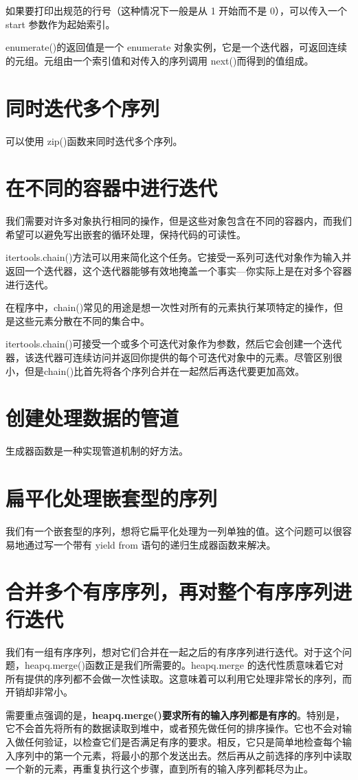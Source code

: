 如果要打印出规范的行号（这种情况下一般是从 1 开始而不是 0），可以传入一个 start 参数作为起始索引。

enumerate()的返回值是一个 enumerate 对象实例，它是一个迭代器，可返回连续的元组。元组由一个索引值和对传入的序列调用 next()而得到的值组成。
\section{同时迭代多个序列}
可以使用 zip()函数来同时迭代多个序列。
\section{在不同的容器中进行迭代}
我们需要对许多对象执行相同的操作，但是这些对象包含在不同的容器内，而我们希望可以避免写出嵌套的循环处理，保持代码的可读性。

itertools.chain()方法可以用来简化这个任务。它接受一系列可迭代对象作为输入并返回一个迭代器，这个迭代器能够有效地掩盖一个事实—你实际上是在对多个容器进行迭代。

在程序中，chain()常见的用途是想一次性对所有的元素执行某项特定的操作，但是这些元素分散在不同的集合中。

itertools.chain()可接受一个或多个可迭代对象作为参数，然后它会创建一个迭代器，该迭代器可连续访问并返回你提供的每个可迭代对象中的元素。尽管区别很小，但是chain()比首先将各个序列合并在一起然后再迭代要更加高效。
\section{创建处理数据的管道}
生成器函数是一种实现管道机制的好方法。
\section{扁平化处理嵌套型的序列}
我们有一个嵌套型的序列，想将它扁平化处理为一列单独的值。这个问题可以很容易地通过写一个带有 yield from 语句的递归生成器函数来解决。
\section{合并多个有序序列，再对整个有序序列进行迭代}
我们有一组有序序列，想对它们合并在一起之后的有序序列进行迭代。对于这个问题，heapq.merge()函数正是我们所需要的。heapq.merge 的迭代性质意味着它对所有提供的序列都不会做一次性读取。这意味着可以利用它处理非常长的序列，而开销却非常小。

需要重点强调的是，\textbf{heapq.merge()要求所有的输入序列都是有序的}。特别是，它不会首先将所有的数据读取到堆中，或者预先做任何的排序操作。它也不会对输入做任何验证，以检查它们是否满足有序的要求。相反，它只是简单地检查每个输入序列中的第一个元素，将最小的那个发送出去。然后再从之前选择的序列中读取一个新的元素，再重复执行这个步骤，直到所有的输入序列都耗尽为止。
